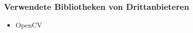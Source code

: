 \subsubsection{Verwendete Bibliotheken von Drittanbieteren}
\begin{itemize}
	\item OpenCV 
\end{itemize}


%



%
%






